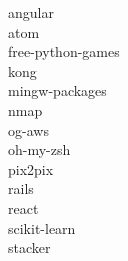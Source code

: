 \noindent
angular\\
atom\\
free-python-games\\
kong\\
mingw-packages\\
nmap\\
og-aws\\
oh-my-zsh\\
pix2pix\\
rails\\
react\\
scikit-learn\\
stacker\\
